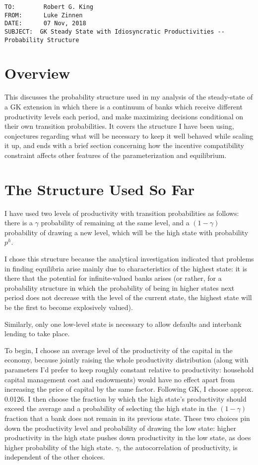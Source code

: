 \documentclass[english]{article}
\begin{document}
\begin{verbatim}
TO:        Robert G. King
FROM:      Luke Zinnen
DATE:      07 Nov, 2018
SUBJECT:  GK Steady State with Idiosyncratic Productivities -- Probability Structure
\end{verbatim}

\section{Overview}
This discusses the probability structure used in my analysis of the steady-state of a GK extension in 
which there is a continuum of banks which receive different productivity levels each period, and make 
maximizing decisions conditional on their own transition probabilities. It covers the structure I have 
been using, conjectures regarding what will be necessary to keep it well behaved while scaling it up, 
and ends with a brief section concerning how the incentive compatibility constraint affects other features of the parameterization and 
equilibrium.

\section{The Structure Used So Far}
I have used two levels of productivity with transition probabilities as follows: there is a $\gamma$ 
probability of remaining at the same level, and a $(1-\gamma)$ probability of drawing a new level, which 
will be the high state with probability $p^h$. 

I chose this structure because the analytical investigation indicated that problems in finding equilibria 
arise mainly due to characteristics of the highest state: it is there that the potential for infinite-valued 
banks arises (or rather, for a probability structure in which the probability of being in higher states next period does not 
decrease with the level of the current state, the highest state will be the first to become explosively valued). 

Similarly, only one low-level state is necessary to allow defaults and interbank lending to take place. 

To begin, I choose an average level of the productivity of the capital in the economy, because jointly 
raising the whole productivity distribution (along with parameters I'd prefer to keep roughly constant 
relative to productivity: household capital management cost and endowments) would have no effect apart 
from increasing the price of capital by the same factor. Following GK, I choose approx. 0.0126. I then choose the fraction by which the high 
state's productivity should exceed the average and a probability of selecting the high state in the 
$(1-\gamma)$ fraction that a bank does not remain in its previous state. These two choices pin down 
the productivity level and probability of drawing the low state: higher productivity in the high state 
pushes down productivity in the low state, as does higher probability of the high state. $\gamma$, the 
autocorrelation of productivity, is independent of the other choices.
\end{document}
